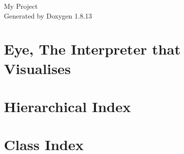 \documentclass[twoside]{book}
\newcommand{\+}{\discretionary{\mbox{\scriptsize$\hookleftarrow$}}{}{}}
\newcommand{\clearemptydoublepage}{%
  \newpage{\pagestyle{empty}\cleardoublepage}%
}
\begin{document}
\hypersetup{pageanchor=false,
             bookmarksnumbered=true,
             pdfencoding=unicode
            }
\begin{titlepage}
\vspace*{7cm}
\begin{center}%
{\Large My Project }\\
\vspace*{1cm}
{\large Generated by Doxygen 1.8.13}\\
\end{center}
\end{titlepage}
\clearemptydoublepage
{}
\tableofcontents
\clearemptydoublepage
{}
\hypersetup{pageanchor=true}

\chapter{Eye, The Interpreter that Visualises}
\label{index}\hypertarget{index}{}
\chapter{Hierarchical Index}

\chapter{Class Index}

\end{document}

